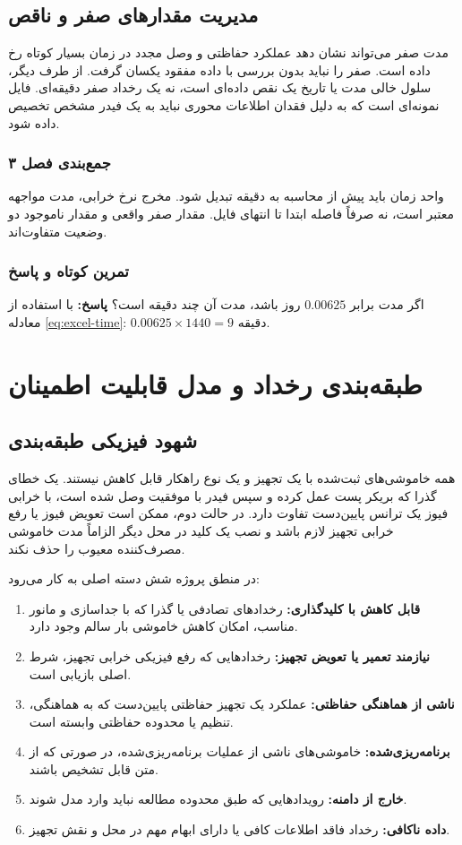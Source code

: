 \documentclass[11pt,a4paper,oneside]{book}
\newcommand{\file}[1]{\lr{\texttt{#1}}}
\newcommand{\summary}[1]{\subsection*{جمع‌بندی فصل #1}}
\newcommand{\exercise}{\subsection*{تمرین کوتاه و پاسخ}}
\newcommand{\answer}{\noindent\textbf{پاسخ:} }
\begin{document}
\section{مدیریت مقدارهای صفر و ناقص}
مدت صفر می‌تواند نشان دهد عملکرد حفاظتی و وصل مجدد در زمان بسیار کوتاه رخ داده است. صفر را نباید بدون بررسی با داده مفقود یکسان گرفت. از طرف دیگر، سلول خالی مدت یا تاریخ یک نقص داده‌ای است، نه یک رخداد صفر دقیقه‌ای. فایل \file{بدون نام فیدر.xlsx} نمونه‌ای است که به دلیل فقدان اطلاعات محوری نباید به یک فیدر مشخص تخصیص داده شود.

\summary{۳}
واحد زمان  باید پیش از محاسبه به دقیقه تبدیل شود. مخرج نرخ خرابی، مدت مواجهه معتبر است، نه صرفاً فاصله ابتدا تا انتهای فایل. مقدار صفر واقعی و مقدار ناموجود دو وضعیت متفاوت‌اند.

\exercise
اگر مدت  برابر $0.00625$ روز باشد، مدت آن چند دقیقه است؟
\answer با استفاده از معادله \eqref{eq:excel-time}: $0.00625\times1440=9$ دقیقه.

\chapter{طبقه‌بندی رخداد و مدل قابلیت اطمینان}
\section{شهود فیزیکی طبقه‌بندی}
همه خاموشی‌های ثبت‌شده با یک تجهیز و یک نوع راهکار قابل کاهش نیستند. یک خطای گذرا که بریکر پست عمل کرده و سپس فیدر با موفقیت وصل شده است، با خرابی فیوز یک ترانس پایین‌دست تفاوت دارد. در حالت دوم، ممکن است تعویض فیوز یا رفع خرابی تجهیز لازم باشد و نصب یک کلید در محل دیگر الزاماً مدت خاموشی مصرف‌کننده معیوب را حذف نکند.

در منطق پروژه شش دسته اصلی به کار می‌رود:
\begin{enumerate}
\item \textbf{قابل کاهش با کلیدگذاری:} رخدادهای تصادفی یا گذرا که با جداسازی و مانور مناسب، امکان کاهش خاموشی بار سالم وجود دارد.
\item \textbf{نیازمند تعمیر یا تعویض تجهیز:} رخدادهایی که رفع فیزیکی خرابی تجهیز، شرط اصلی بازیابی است.
\item \textbf{ناشی از هماهنگی حفاظتی:} عملکرد یک تجهیز حفاظتی پایین‌دست که به هماهنگی، تنظیم یا محدوده حفاظتی وابسته است.
\item \textbf{برنامه‌ریزی‌شده:} خاموشی‌های ناشی از عملیات برنامه‌ریزی‌شده، در صورتی که از متن قابل تشخیص باشند.
\item \textbf{خارج از دامنه:} رویدادهایی که طبق محدوده مطالعه نباید وارد مدل شوند.
\item \textbf{داده ناکافی:} رخداد فاقد اطلاعات کافی یا دارای ابهام مهم در محل و نقش تجهیز.
\end{enumerate}
\end{document}
